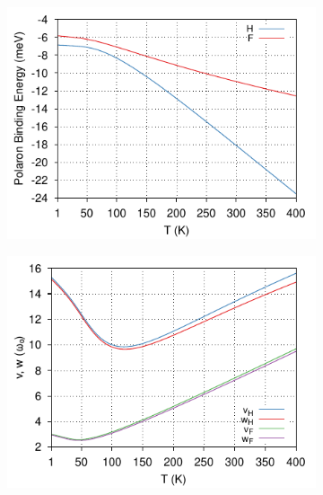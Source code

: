 \begin{figure}[!tbp]
    \centering
  \begin{subfigure}[b]{0.49\textwidth}
    \centering
    \includegraphics[width=\textwidth]{figures/rubrene-energy-temp-1to400K-COLOUR.pdf}
    \label{fig:rubrene_F_temp}
  \end{subfigure}
  \hfill
  \begin{subfigure}[b]{0.49\textwidth}
    \centering
    \includegraphics[width=\textwidth]{figures/rubrene-vw-temp-1to400K-COLOUR.pdf}
    \label{fig:rubene_vw_temp}
  \end{subfigure}
  \begin{subfigure}[b]{0.49\textwidth}
    \centering

\end{subfigure}
\end{figure}
